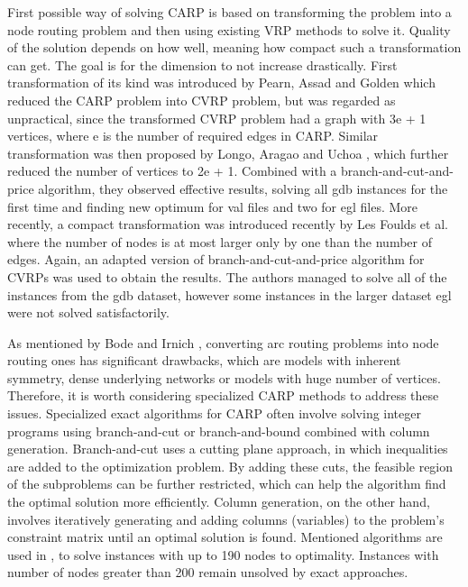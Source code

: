 \documentclass[twoside]{ctuthesis}
\theoremstyle{plain}
\theoremstyle{definition}
\theoremstyle{note}
\begin{document}
First possible way of solving CARP is based on transforming the problem into a node routing problem and then using existing VRP methods to solve it. Quality of the solution depends on how well, meaning how compact such a transformation can get. The goal is for the dimension to not increase drastically.
First transformation of its kind was introduced by Pearn, Assad and Golden \cite{PEARN1987285} which reduced the CARP problem into CVRP problem, but was regarded as unpractical, since the transformed CVRP problem had a graph with 3e + 1 vertices, where e is the number of required edges in CARP. Similar transformation was then proposed by Longo, Aragao and Uchoa \cite{LONGO20061823}, which further reduced the number of vertices to 2e + 1. Combined with a branch-and-cut-and-price algorithm, they observed effective results, solving all gdb instances for the first time and finding new optimum for val files and two for egl files.
More recently, a compact transformation was introduced recently by Les Foulds et al. \cite{foulds2015compact} where the number of nodes is at most larger only by one than the number of edges. Again, an adapted version of branch-and-cut-and-price algorithm for CVRPs was used to obtain the results. The authors managed to solve all of the instances from the gdb dataset, however some instances in the larger dataset egl were not solved satisfactorily.

As mentioned by Bode and Irnich \cite{bode2012cut}, converting arc routing problems into node routing ones has significant drawbacks, which are models with inherent symmetry, dense underlying networks or models with huge number of vertices. Therefore, it is worth considering specialized CARP methods to address these issues. 
Specialized exact algorithms for CARP often involve solving integer programs using branch-and-cut or branch-and-bound combined with column generation. Branch-and-cut uses a cutting plane approach, in which inequalities are added to the optimization problem.  By adding these cuts, the feasible region of the subproblems can be further restricted, which can help the algorithm find the optimal solution more efficiently. Column generation, on the other hand, involves iteratively generating and adding columns (variables) to the problem's constraint matrix until an optimal solution is found. Mentioned algorithms are used in \cite{bode2012cut}, \cite{bartolini2013improved} to solve instances with up to 190 nodes to optimality. Instances with number of nodes greater than 200 remain unsolved by exact approaches. 
\end{document}
